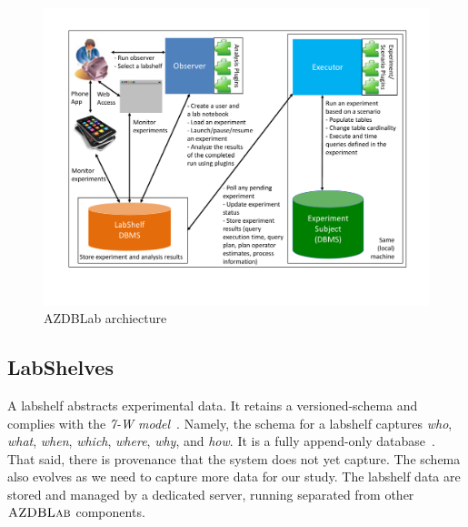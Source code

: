 \documentclass[conference]{IEEEtran}
\def\azdb{\hbox{\sc AZDBLab}}
\begin{document}
\begin{figure}[t]
\centering
\includegraphics[scale=0.4]{./figures/azdblab_arch}
\caption{{\sc AZDBLab} archiecture~\label{fig:azdblab_arch}}
\end{figure}

\subsection{LabShelves}
A labshelf abstracts experimental data. It retains a versioned-schema 
and complies with the {\em 7-W model}~\cite{Ram}. 
Namely, the schema for a labshelf captures {\em who}, {\em what}, {\em when}, {\em which}, {\em where}, 
{\em why}, and {\em how}. It is a fully append-only database~\cite{Snodgrass99}. 
That said, there is provenance 
that the system does not yet capture. The schema also evolves as we need to capture more data for our study. 
The labshelf data are stored and managed by a dedicated server, 
running separated from other $\azdb$ components. 
\end{document}

